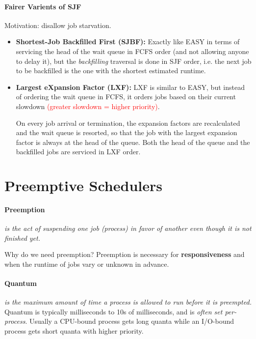 \documentclass[openany,12pt]{book}
\newcommand{\red}[1]{\textcolor{Red}{#1}}
\begin{document}
\paragraph{Fairer Varients of SJF} Motivation: disallow job starvation.
\begin{itemize}
  \item \textbf{Shortest-Job Backfilled First (SJBF):} Exactly like EASY in terms of servicing the head of the wait queue in FCFS order (and not allowing anyone to delay it), but the \textit{backfilling} traversal is done in SJF order, i.e. the next job to be backfilled is the one with the shortest estimated runtime.

  \item \textbf{Largest eXpansion Factor (LXF):} LXF is similar to EASY, but instead of ordering the wait queue in FCFS, it orders jobs based on their current slowdown \red{(greater slowdown = higher priority)}.

        \indent On every job arrival or termination, the expansion factors are recalculated and the wait queue is resorted, so that the job with the largest expansion factor is always at the head of the queue. Both the head of the queue and the backfilled jobs are serviced in LXF order.
\end{itemize}



\newpage
\section*{Preemptive Schedulers}
\paragraph{Preemption} \textit{is the act of suspending one job (process) in favor of another even though it is not finished yet.}

Why do we need preemption? Preemption is necessary for \textbf{responsiveness} and when the runtime of jobs vary or unknown in advance.

\paragraph{Quantum} \textit{is the maximum amount of time a process is allowed to run before it is preempted.} Quantum is typically milliseconds to 10s of milliseconds, and is \textit{often set per-process}. Usually a CPU-bound process gets long quanta while an I/O-bound process gets short quanta with higher priority.
\end{document}
